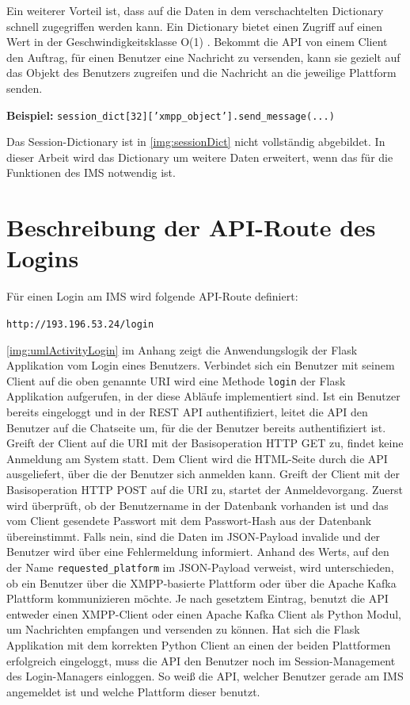 \documentclass[a4paper,titlepage,halfparskip,12pt]{scrreprt}
\begin{document}
\begin{onehalfspacing}
Ein weiterer Vorteil ist, dass auf die Daten in dem verschachtelten Dictionary schnell zugegriffen werden kann. Ein Dictionary bietet einen Zugriff auf einen Wert in der Geschwindigkeitsklasse O(1) \cite{pythonSpeed}. Bekommt die \acs{API} von einem Client den Auftrag, für einen Benutzer eine Nachricht zu versenden, kann sie gezielt auf das Objekt des Benutzers zugreifen und die Nachricht an die jeweilige Plattform senden.

\textbf{Beispiel:} \texttt{session\_dict[32]['xmpp\_object'].send\_message(...)}

Das Session-Dictionary ist in \autoref{img:sessionDict} nicht vollständig abgebildet. In dieser Arbeit wird das Dictionary um weitere Daten erweitert, wenn das für die Funktionen des \acs{IMS} notwendig ist.

\section{Beschreibung der \acs{API}-Route des Logins}

Für einen Login am \ac{IMS} wird folgende \acs{API}-Route definiert:

\texttt{http://193.196.53.24/login}

\autoref{img:umlActivityLogin} im Anhang zeigt die Anwendungslogik der Flask Applikation vom Login eines Benutzers. Verbindet sich ein Benutzer mit seinem Client auf die oben genannte \acs{URI} wird eine Methode \texttt{login} der Flask Applikation aufgerufen, in der diese Abläufe implementiert sind. Ist ein Benutzer bereits eingeloggt und in der \acs{REST} \acs{API} authentifiziert, leitet die \acs{API} den Benutzer auf die Chatseite um, für die der Benutzer bereits authentifiziert ist. Greift der Client auf die \acs{URI} mit der Basisoperation \acs{HTTP} GET zu, findet keine Anmeldung am System statt. Dem Client wird die \acs{HTML}-Seite durch die \acs{API} ausgeliefert, über die der Benutzer sich anmelden kann. Greift der Client mit der Basisoperation \acs{HTTP} POST auf die \acs{URI} zu, startet der Anmeldevorgang. Zuerst wird überprüft, ob der Benutzername in der Datenbank vorhanden ist und das vom Client gesendete Passwort mit dem Passwort-Hash aus der Datenbank übereinstimmt. Falls nein, sind die Daten im \acs{JSON}-Payload invalide und der Benutzer wird über eine Fehlermeldung informiert. Anhand des Werts, auf den der Name \texttt{requested\_platform} im \acs{JSON}-Payload verweist, wird unterschieden, ob ein Benutzer über die \acs{XMPP}-basierte Plattform oder über die Apache Kafka Plattform kommunizieren möchte. Je nach gesetztem Eintrag, benutzt die \acs{API} entweder einen \acs{XMPP}-Client oder einen Apache Kafka Client als Python Modul, um Nachrichten empfangen und versenden zu können. Hat sich die Flask Applikation mit dem korrekten Python Client an einen der beiden Plattformen erfolgreich eingeloggt, muss die \ac{API} den Benutzer noch im Session-Management des Login-Managers einloggen. So weiß die \acs{API}, welcher Benutzer gerade am \acs{IMS} angemeldet ist und welche Plattform dieser benutzt.


\end{onehalfspacing}
\end{document}
